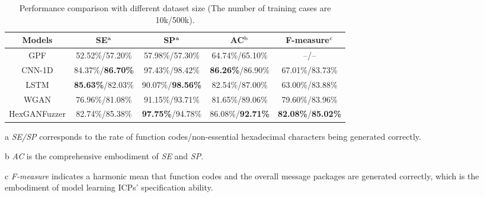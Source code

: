\begin{table}[t]
	\centering
	\caption{Performance comparison with different dataset size (The number of training cases are 10k/500k).} 
	\label{F-measure}
	\renewcommand{\arraystretch}{1.5}
	\begin{threeparttable}
	\begin{tabular}{c|c|c|c|c}
		\hline
		\textbf{Models}          & \textbf{SE$^{\rm a}$} & \textbf{SP$^{\rm a}$}     & \textbf{AC$^{\rm b}$}     & \textbf{F-measure$^{\rm c}$}     \\ \hline
		GPF               &  52.52\%/57.20\% & 57.98\%/57.30\% & 64.74\%/65.10\%  & --/-- \\ [3pt]
		\hline
		CNN-1D     &  84.37\%/\textbf{86.70\%}    & 97.43\%/98.42\% & \textbf{86.26\%}/86.90\% &  67.01\%/83.73\% \\ [3pt]
		\hline
		LSTM  &    \textbf{85.63\%}/82.03\%  &  90.07\%/\textbf{98.56\%}  &82.54\%/87.00\%  &  63.00\%/83.88\%\\ [3pt]
		\hline
		WGAN &    76.96\%/81.08\%   & 91.15\%/93.71\%& 81.65\%/89.06\% & 79.60\%/83.96\% \\ [3pt]
		\hline
		HexGANFuzzer      &  82.74\%/85.38\%    &  \textbf{97.75\%}/94.78\%& 86.08\%/\textbf{92.71\%} & \textbf{82.08\%}/\textbf{85.02\%} \\ [3pt]
		\hline
	\end{tabular}
	\begin{tablenotes}
		\item[a] \textit{SE/SP} corresponds to the rate of function codes/non-essential hexadecimal characters being generated correctly.
		\item[b] \textit{AC} is the comprehensive embodiment of \textit{SE} and \textit{SP}.
		\item[c] \textit{F-measure} indicates a harmonic mean that function codes and the overall message packages are generated correctly, which is the embodiment of model learning ICPs' specification ability.
	\end{tablenotes}
\end{threeparttable}
\end{table}


